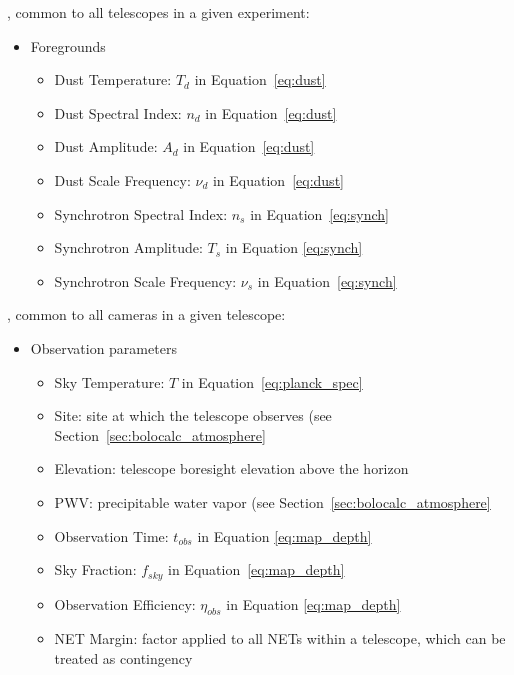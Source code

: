 \noindent
{}, common to all telescopes in a given experiment:
\begin{itemize}
    \item Foregrounds
        \begin{itemize}
        \item Dust Temperature: $T_{d}$ in Equation~\ref{eq:dust}
        \item Dust Spectral Index: $n_{d}$ in Equation~\ref{eq:dust}
        \item Dust Amplitude: $A_{d}$ in Equation~\ref{eq:dust}
        \item Dust Scale Frequency: $\nu_{d}$ in Equation~\ref{eq:dust}
        \item Synchrotron Spectral Index: $n_{s}$ in Equation~\ref{eq:synch}
        \item Synchrotron Amplitude: $T_{s}$ in Equation \ref{eq:synch}
        \item Synchrotron Scale Frequency: $\nu_{s}$ in Equation~\ref{eq:synch}
        \end{itemize}
\end{itemize}

\noindent
{}, common to all cameras in a given telescope:
\begin{itemize}
    \item Observation parameters
        \begin{itemize}
        \item Sky Temperature: $T$ in Equation~\ref{eq:planck_spec}
        \item Site: site at which the telescope observes (see Section~\ref{sec:bolocalc_atmosphere}
        \item Elevation: telescope boresight elevation above the horizon
        \item PWV: precipitable water vapor (see Section~\ref{sec:bolocalc_atmosphere}
        \item Observation Time: $t_{obs}$ in Equation \ref{eq:map_depth}
        \item Sky Fraction: $f_{sky}$ in Equation~\ref{eq:map_depth}
        \item Observation Efficiency: $\eta_{obs}$ in Equation \ref{eq:map_depth}
        \item NET Margin: factor applied to all NETs within a telescope, which can be treated as contingency
        \end{itemize}
\end{itemize}

